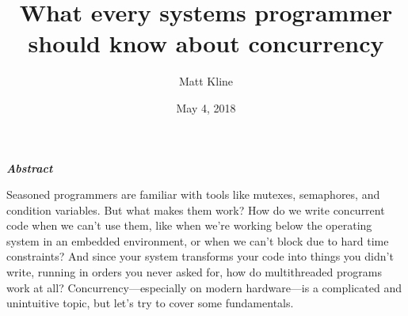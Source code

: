 \documentclass[fontsize=\bodyfontsize, numbers=endperiod]{scrartcl}
\title{What every systems programmer should know about concurrency}
\author{Matt Kline}
\date{May 4, 2018}
\makeatletter
\let\runauthor\@author
\let\rundate\@date
\let\runtitle\@title
\makeatother
\begin{document}
\begin{center}
\Large \runtitle
\bigskip

\large
\runauthor
\smallskip

\normalsize
\rundate
\end{center}
\bigskip

\ifebook
\else
\begin{adjustwidth}{1in}{1in}
\fi
\begin{center}
\large \bfseries\itshape Abstract
\end{center}
\smallskip

\noindent
Seasoned programmers are familiar with tools like mutexes, semaphores,
and condition variables.
But what makes them work?
How do we write concurrent code when we can't use them,
like when we're working below the operating system in an embedded environment,
or when we can't block due to hard time constraints?
And since your system transforms your code into things you didn't write,
running in orders you never asked for, how do multithreaded programs work at all?
Concurrency---especially on modern hardware---is a complicated and unintuitive
topic, but let's try to cover some fundamentals.
\bigskip

\tableofcontents
\ifebook
\else
\end{adjustwidth}
\fi
\medskip
\end{document}
